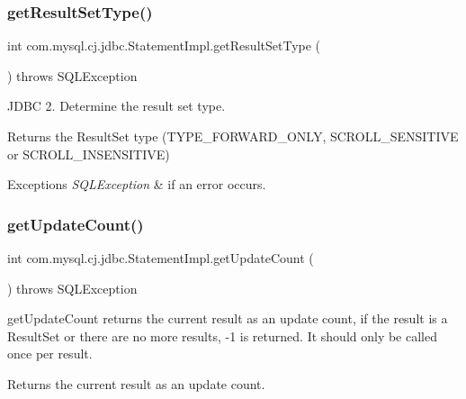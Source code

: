 \subsubsection{\texorpdfstring{get\+Result\+Set\+Type()}{getResultSetType()}}
{\footnotesize\ttfamily int com.\+mysql.\+cj.\+jdbc.\+Statement\+Impl.\+get\+Result\+Set\+Type (\begin{DoxyParamCaption}{ }\end{DoxyParamCaption}) throws S\+Q\+L\+Exception}

J\+D\+BC 2. Determine the result set type.

\begin{DoxyReturn}{Returns}
the Result\+Set type (T\+Y\+P\+E\+\_\+\+F\+O\+R\+W\+A\+R\+D\+\_\+\+O\+N\+LY, S\+C\+R\+O\+L\+L\+\_\+\+S\+E\+N\+S\+I\+T\+I\+VE or S\+C\+R\+O\+L\+L\+\_\+\+I\+N\+S\+E\+N\+S\+I\+T\+I\+VE)
\end{DoxyReturn}

\begin{DoxyExceptions}{Exceptions}
{\em S\+Q\+L\+Exception} & if an error occurs. \\
\hline
\end{DoxyExceptions}
\mbox{\label{classcom_1_1mysql_1_1cj_1_1jdbc_1_1_statement_impl_abb1d31f01f22e76a4d2a03c26905cb2e}} 
\subsubsection{\texorpdfstring{get\+Update\+Count()}{getUpdateCount()}}
{\footnotesize\ttfamily int com.\+mysql.\+cj.\+jdbc.\+Statement\+Impl.\+get\+Update\+Count (\begin{DoxyParamCaption}{ }\end{DoxyParamCaption}) throws S\+Q\+L\+Exception}

get\+Update\+Count returns the current result as an update count, if the result is a Result\+Set or there are no more results, -\/1 is returned. It should only be called once per result.

\begin{DoxyReturn}{Returns}
the current result as an update count.
\end{DoxyReturn}

